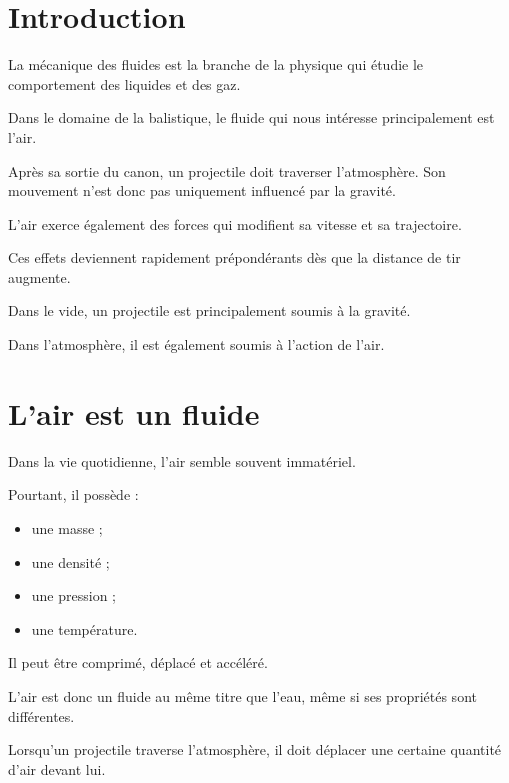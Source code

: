 
\section{Introduction}

La mécanique des fluides est la branche de la physique qui étudie le
comportement des liquides et des gaz.

Dans le domaine de la balistique, le fluide qui nous intéresse
principalement est l'air.

Après sa sortie du canon, un projectile doit traverser l'atmosphère.
Son mouvement n'est donc pas uniquement influencé par la gravité.

L'air exerce également des forces qui modifient sa vitesse et sa
trajectoire.

Ces effets deviennent rapidement prépondérants dès que la distance de tir
augmente.

\begin{aretenir}

Dans le vide, un projectile est principalement soumis à la gravité.

Dans l'atmosphère, il est également soumis à l'action de l'air.

\end{aretenir}

\section{L'air est un fluide}

Dans la vie quotidienne, l'air semble souvent immatériel.

Pourtant, il possède :

\begin{itemize}
\item une masse ;
\item une densité ;
\item une pression ;
\item une température.
\end{itemize}

Il peut être comprimé, déplacé et accéléré.

L'air est donc un fluide au même titre que l'eau, même si ses propriétés
sont différentes.

Lorsqu'un projectile traverse l'atmosphère, il doit déplacer une certaine
quantité d'air devant lui.

